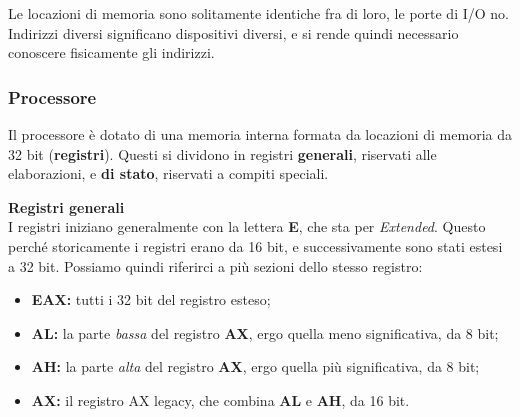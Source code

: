 \documentclass[a4paper,11pt]{article}
\begin{document}
Le locazioni di memoria sono solitamente identiche fra di loro, le porte di I/O no.
Indirizzi diversi significano dispositivi diversi, e si rende quindi necessario conoscere fisicamente gli indirizzi.

\subsubsection{Processore}
Il processore è dotato di una memoria interna formata da locazioni di memoria da 32 bit (\textbf{registri}).
Questi si dividono in registri \textbf{generali}, riservati alle elaborazioni, e \textbf{di stato}, riservati a compiti speciali.

\par\medskip
\noindent
\textbf{\textsf{Registri generali}} \\
I registri iniziano generalmente con la lettera \textbf{E}, che sta per \textit{Extended}.
Questo perché storicamente i registri erano da 16 bit, e successivamente sono stati estesi a 32 bit.
Possiamo quindi riferirci a più sezioni dello stesso registro:
\begin{itemize}
	\item \textbf{EAX:} tutti i 32 bit del registro esteso;
	\item \textbf{AL:} la parte \textit{bassa} del registro \textbf{AX}, ergo quella meno significativa, da 8 bit;
	\item \textbf{AH:} la parte \textit{alta} del registro \textbf{AX}, ergo quella più significativa, da 8 bit;
	\item \textbf{AX:} il registro AX legacy, che combina \textbf{AL} e \textbf{AH}, da 16 bit.
 \end{itemize}
\end{document}
